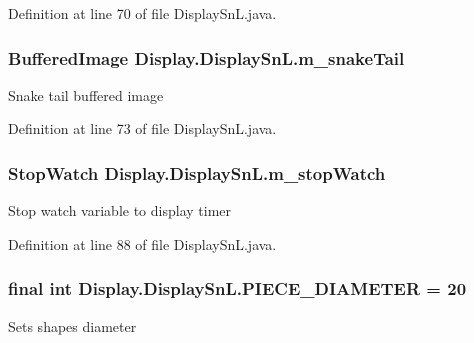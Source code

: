 Definition at line 70 of file Display\+Sn\+L.\+java.

\hypertarget{class_display_1_1_display_sn_l_a6821965beb6bde17ff10f6e3e09f3287}{}
\subsubsection[{m\+\_\+snake\+Tail}]{\setlength{\rightskip}{0pt plus 5cm}Buffered\+Image Display.\+Display\+Sn\+L.\+m\+\_\+snake\+Tail\hspace{0.3cm}{\ttfamily [private]}}\label{class_display_1_1_display_sn_l_a6821965beb6bde17ff10f6e3e09f3287}
Snake tail buffered image 

Definition at line 73 of file Display\+Sn\+L.\+java.

\hypertarget{class_display_1_1_display_sn_l_a4e69018d83aaba48baa701597a876bf6}{}
\subsubsection[{m\+\_\+stop\+Watch}]{\setlength{\rightskip}{0pt plus 5cm}Stop\+Watch Display.\+Display\+Sn\+L.\+m\+\_\+stop\+Watch\hspace{0.3cm}{\ttfamily [private]}}\label{class_display_1_1_display_sn_l_a4e69018d83aaba48baa701597a876bf6}
Stop watch variable to display timer 

Definition at line 88 of file Display\+Sn\+L.\+java.

\hypertarget{class_display_1_1_display_sn_l_ac8f487404183209a60d90af4124eb61c}{}
\subsubsection[{P\+I\+E\+C\+E\+\_\+\+D\+I\+A\+M\+E\+T\+E\+R}]{\setlength{\rightskip}{0pt plus 5cm}final int Display.\+Display\+Sn\+L.\+P\+I\+E\+C\+E\+\_\+\+D\+I\+A\+M\+E\+T\+E\+R = 20\hspace{0.3cm}{\ttfamily [static]}}\label{class_display_1_1_display_sn_l_ac8f487404183209a60d90af4124eb61c}
Sets shape\textquotesingle{}s diameter 


